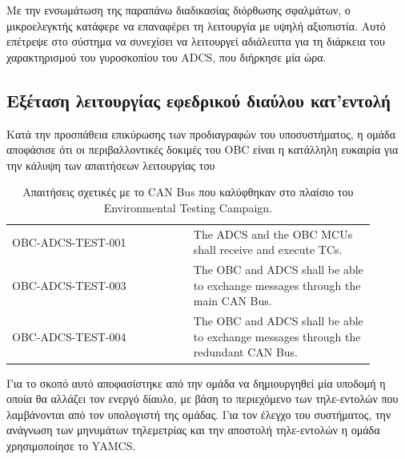 \documentclass[a4paper,nobib,justified]{tufte-book}
\begin{document}
Με την ενσωμάτωση της παραπάνω διαδικασίας διόρθωσης σφαλμάτων, ο μικροελεγκτής κατάφερε να επαναφέρει τη λειτουργία με υψηλή αξιοπιστία. Αυτό επέτρεψε στο σύστημα να συνεχίσει να λειτουργεί αδιάλειπτα για τη διάρκεια του χαρακτηρισμού του γυροσκοπίου του ADCS, που διήρκησε μία ώρα.

\subsection{Εξέταση λειτουργίας εφεδρικού διαύλου κατ'εντολή}
\label{chap:switch-tc}
Κατά την προσπάθεια επικύρωσης των προδιαγραφών του υποσυστήματος, η ομάδα αποφάσισε ότι οι περιβαλλοντικές δοκιμές του OBC είναι η κατάλληλη ευκαιρία για την κάλυψη των απαιτήσεων λειτουργίας του 

\begin{table}
    \centering
    \caption[Απαιτήσεις σχετικές με το CAN Bus]{Απαιτήσεις σχετικές με το CAN Bus που καλύφθηκαν στο πλαίσιο του Environmental Testing Campaign.}
    \label{tab:campaign-requirements}
    \begin{tabular}{|p{0.45\linewidth}|p{0.45\linewidth}|}
        \hline
        \rowcolor[HTML]{4F5054}
        \multicolumn{2}{|c|}{\color[HTML]{FFFFFF} Requirements} \\ \hline
        \rowcolor[HTML]{F0F0F1} OBC-ADCS-TEST-001 & The ADCS and the OBC MCUs shall receive and execute TCs. \\ \hline
        \rowcolor[HTML]{F0F0F1} OBC-ADCS-TEST-003 & The OBC and ADCS shall be able to exchange messages through the main CAN Bus. \\ \hline
        \rowcolor[HTML]{F0F0F1} OBC-ADCS-TEST-004 & The OBC and ADCS shall be able to exchange messages through the redundant CAN Bus. \\ \hline
    \end{tabular}
\end{table}


Για το σκοπό αυτό αποφασίστηκε από την ομάδα να δημιουργηθεί μία υποδομή η οποία θα αλλάζει τον ενεργό δίαυλο, με βάση το περιεχόμενο των τηλε-εντολών που λαμβάνονται από τον υπολογιστή της ομάδας. Για τον έλεγχο του συστήματος, την ανάγνωση των μηνυμάτων τηλεμετρίας και την αποστολή τηλε-εντολών η ομάδα χρησιμοποίησε το YAMCS.
\end{document}
